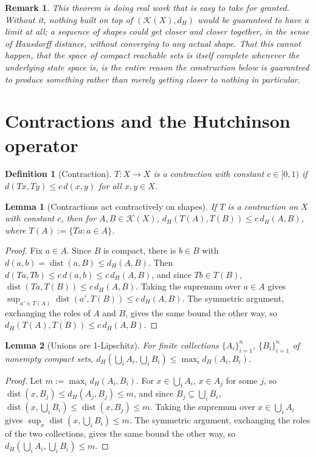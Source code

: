\documentclass[11pt]{report}
\newtheorem{lemma}{Lemma}[chapter]
\newtheorem{definition}{Definition}[chapter]
\newtheorem{remark}{Remark}[chapter]
\begin{document}
\begin{remark}
This theorem is doing real work that is easy to take for granted.
Without it, nothing built on top of $(\mathcal{K}(X), d_H)$ would be
guaranteed to have a limit at all; a sequence of shapes could get
closer and closer together, in the sense of Hausdorff distance,
without converging to any actual shape. That this cannot happen, that
the space of compact reachable sets is itself complete whenever the
underlying state space is, is the entire reason the construction
below is guaranteed to produce something rather than merely getting
closer to nothing in particular.
\end{remark}

\section*{Contractions and the Hutchinson operator}

\begin{definition}[Contraction]
$T : X \to X$ is a contraction with constant $c \in [0,1)$ if
$d(Tx, Ty) \leq c\, d(x,y)$ for all $x, y \in X$.
\end{definition}

\begin{lemma}[Contractions act contractively on shapes]
\label{lem:setcontract}
If $T$ is a contraction on $X$ with constant $c$, then for
$A, B \in \mathcal{K}(X)$, $d_H(T(A), T(B)) \leq c\, d_H(A,B)$, where
$T(A) := \{Ta : a \in A\}$.
\end{lemma}
\begin{proof}
Fix $a \in A$. Since $B$ is compact, there is $b \in B$ with
$d(a,b) = \operatorname{dist}(a,B) \leq d_H(A,B)$. Then
$d(Ta,Tb) \leq c\, d(a,b) \leq c\, d_H(A,B)$, and since
$Tb \in T(B)$, $\operatorname{dist}(Ta, T(B)) \leq c\, d_H(A,B)$.
Taking the supremum over $a \in A$ gives
$\sup_{a' \in T(A)} \operatorname{dist}(a', T(B)) \leq c\, d_H(A,B)$.
The symmetric argument, exchanging the roles of $A$ and $B$, gives the
same bound the other way, so $d_H(T(A),T(B)) \leq c\, d_H(A,B)$.
\end{proof}

\begin{lemma}[Unions are 1-Lipschitz]
\label{lem:unionlip}
For finite collections $\{A_i\}_{i=1}^n$, $\{B_i\}_{i=1}^n$ of nonempty
compact sets, $d_H\left(\bigcup_i A_i, \bigcup_i B_i\right) \leq
\max_i d_H(A_i, B_i)$.
\end{lemma}
\begin{proof}
Let $m := \max_i d_H(A_i,B_i)$. For $x \in \bigcup_i A_i$, $x \in A_j$
for some $j$, so $\operatorname{dist}(x, B_j) \leq d_H(A_j,B_j) \leq m$,
and since $B_j \subseteq \bigcup_i B_i$,
$\operatorname{dist}(x, \bigcup_i B_i) \leq \operatorname{dist}(x,B_j) \leq m$.
Taking the supremum over $x \in \bigcup_i A_i$ gives
$\sup_{x} \operatorname{dist}(x, \bigcup_i B_i) \leq m$. The symmetric
argument, exchanging the roles of the two collections, gives the same
bound the other way, so
$d_H\left(\bigcup_i A_i, \bigcup_i B_i\right) \leq m$.
\end{proof}
\end{document}
